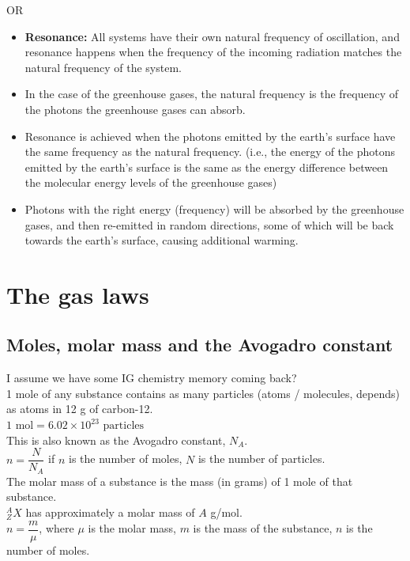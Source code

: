 OR
\begin{itemize}
  \item \textbf{Resonance:} All systems have their own natural frequency of oscillation, and resonance happens when the frequency of the incoming radiation matches the natural frequency of the system.
  \item In the case of the greenhouse gases, the natural frequency is the frequency of the photons the greenhouse gases can absorb.
  \item Resonance is achieved when the photons emitted by the earth's surface have the same frequency as the natural frequency. (i.e., the energy of the photons emitted by the earth's surface is the same as the energy difference between the molecular energy levels of the greenhouse gases)
  \item Photons with the right energy (frequency) will be absorbed by the greenhouse gases, and then re-emitted in random directions, some of which will be back towards the earth's surface, causing additional warming.
\end{itemize}
\section{The gas laws}
\subsection{Moles, molar mass and the Avogadro constant}
I assume we have some IG chemistry memory coming back?\\
1 mole of any substance contains as many particles (atoms / molecules, depends) as atoms in 12 g of carbon-12.\\
$1 \text{ mol} = 6.02 \times 10^{23} \text{ particles}$\\
This is also known as the Avogadro constant, $N_A$.\\
$n=\dfrac{N}{N_A}$ if $n$ is the number of moles, $N$ is the number of particles.\\
The molar mass of a substance is the mass (in grams) of 1 mole of that substance.\\
$_Z^AX$ has approximately a molar mass of $A$ g/mol.\\
$n=\dfrac{m}{\mu}$, where $\mu$ is the molar mass, $m$ is the mass of the substance, $n$ is the number of moles.

